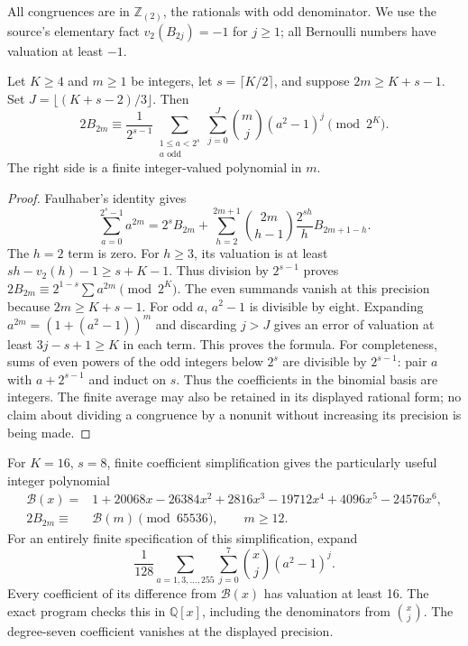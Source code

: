All congruences are in $\mathbb Z_{(2)}$, the rationals with odd
denominator. We use the source's elementary fact
$v_2(B_{2j})=-1$ for $j\ge1$; all Bernoulli numbers have valuation
at least $-1$.

\begin{lemma}\label{rt:general-B}
Let $K\ge4$ and $m\ge1$ be integers, let $s=\lceil K/2\rceil$, and suppose
$2m\ge K+s-1$. Set $J=\lfloor(K+s-2)/3\rfloor$. Then
\[
 2B_{2m}\equiv \frac1{2^{s-1}}
 \sum_{\substack{1\le a<2^s\\a\text{ odd}}}
 \sum_{j=0}^{J}\binom mj(a^2-1)^j\pmod{2^K}.
\]
The right side is a finite integer-valued polynomial in $m$.
\end{lemma}
\begin{proof}
Faulhaber's identity gives
\[
 \sum_{a=0}^{2^s-1}a^{2m}
 =2^sB_{2m}+
 \sum_{h=2}^{2m+1}\binom{2m}{h-1}\frac{2^{sh}}h
                         B_{2m+1-h}.
\]
The $h=2$ term is zero. For $h\ge3$, its valuation is at least
$sh-v_2(h)-1\ge s+K-1$. Thus division by $2^{s-1}$ proves
$2B_{2m}\equiv2^{1-s}\sum a^{2m}\pmod{2^K}$. The even summands
vanish at this precision because $2m\ge K+s-1$.
For odd $a$, $a^2-1$ is divisible by eight. Expanding
$a^{2m}=(1+(a^2-1))^m$ and discarding $j>J$ gives an error of
valuation at least $3j-s+1\ge K$ in each term. This proves the
formula. For completeness, sums of even powers of the odd integers below $2^s$ are divisible by $2^{s-1}$: pair $a$ with $a+2^{s-1}$ and induct on $s$. Thus the coefficients in the binomial basis are integers. The finite average may also be retained in its displayed
rational form; no claim about dividing a congruence by a nonunit
without increasing its precision is being made.
\end{proof}

For $K=16$, $s=8$, finite coefficient simplification gives the
particularly useful integer polynomial
\begin{equation}\label{rt:B16}
 \begin{split}
 \mathcal B(x)={}&1+20068x-26384x^2+2816x^3-19712x^4
                  +4096x^5-24576x^6,\\
 2B_{2m}\equiv{}&\mathcal B(m)\pmod{65536},\qquad m\ge12.
 \end{split}
\end{equation}
For an entirely finite specification of this simplification, expand
\[
 \frac1{128}\sum_{a=1,3,\ldots,255}
       \sum_{j=0}^{7}\binom{x}{j}(a^2-1)^j.
\]
Every coefficient of its difference from $\mathcal B(x)$ has
valuation at least 16. The exact program checks this in
$\mathbb Q[x]$, including the denominators from $\binom{x}{j}$.
The degree-seven coefficient vanishes at the displayed precision.

